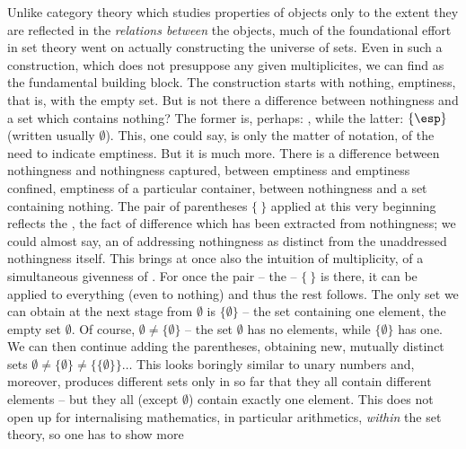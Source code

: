 Unlike category theory which studies properties of objects only to the extent
they are reflected in the {\em relations between} the objects, much of the
foundational effort in set theory went on actually constructing the universe of
sets. Even in such a construction, which does not presuppose any given
multiplicites, we can find  as the fundamental building
block. The construction starts with nothing, emptiness, that is, with the empty
set.  But is not there a difference between nothingness and a set which contains
nothing? The former is, perhaps: \esp, while the latter: $\{\esp\}$ (written
usually $\emptyset$). This, one could say, is only the matter of notation, of
the need to indicate emptiness. But it is much more.  There is a difference
between nothingness and nothingness captured, between emptiness and emptiness
confined, emptiness of a particular container, between nothingness and a set
containing nothing. The pair of parentheses $\{\ \}$ applied at this very
beginning reflects the , the fact of difference which has
been extracted from nothingness; we could almost say, an  of
 addressing nothingness as distinct from the unaddressed
nothingness itself. This  brings at once also the intuition of
multiplicity, of a simultaneous givenness of .  For once the pair -- the  -- $\{\ \}$ is there, it can
be applied to 
everything (even to nothing) and thus the rest follows.  The only set we can
obtain at the next stage from $\emptyset$ is $\{\emptyset\}$ -- the set
containing one element, the empty set $\emptyset$.  Of course, $\emptyset
\not=\{\emptyset\}$ -- the set $\emptyset$ has no elements, while
$\{\emptyset\}$ has one.  We can then continue adding the parentheses, obtaining
new, mutually distinct sets $\emptyset \not= \{\emptyset\} \not=
\{\{\emptyset\}\}\ldots$ This looks boringly similar
to unary numbers and, moreover, produces different sets only in so far that they
all contain different elements -- but they all (except $\emptyset$) contain
exactly one element.  This does not open up for internalising mathematics, in
particular arithmetics, {\em within} the set theory, so one has to show more
